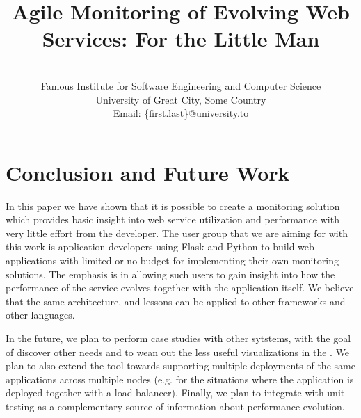 \documentclass[conference]{IEEEtran}
\begin{document}
	

%
\title{Agile Monitoring of Evolving Web Services: For the Little Man}

\author{
\\
Famous Institute for Software Engineering and Computer Science\\
University of Great City, Some Country\\
Email: \{first.last\}@university.to 
}


\maketitle



















% 






\section{Conclusion and Future Work}
\label{sec:conclusions}


In this paper we have shown that it is possible to create a monitoring solution which provides basic insight into web service utilization and performance  with very little effort from the developer. The user group that we are aiming for with this work is application developers using Flask and Python to build web applications with limited or no budget for implementing their own monitoring solutions. The emphasis is in allowing such users to gain insight into how the performance of the service evolves together with the application itself. We believe that the same architecture, and lessons can be applied to other frameworks and other languages.

In the future, we plan to perform case studies with other sytstems, with the goal of discover other needs and to wean out the less useful visualizations in the \tool. We plan to also extend the tool towards supporting multiple deployments of the same applications across multiple nodes (e.g. for the situations where the application is deployed together with a load balancer). Finally, we plan to integrate \tool with unit testing as a complementary source of information about performance evolution.



% 







\end{document}
